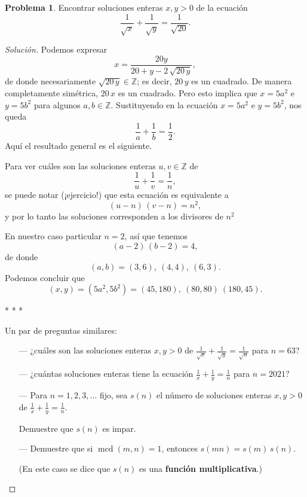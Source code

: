 \documentclass{article}
\newcommand{\ZZ}{\mathbb{Z}}
\DeclareMathOperator{\mcd}{mcd}
\theoremstyle{definition}
\newtheorem{problema}{Problema}
\newenvironment{solucion}{\begin{proof}[Solución]}{\end{proof}}
\begin{document}
\begin{problema}
  Encontrar soluciones enteras $x, y > 0$ de la ecuación
  $$\frac{1}{\sqrt{x}} + \frac{1}{\sqrt{y}} = \frac{1}{\sqrt{20}}.$$

  \ifdefined\solutions\begin{solucion}    
    Podemos expresar
    $$x = \frac{20y}{20 + y - 2\,\sqrt{20\,y}},$$
    de donde necesariamente $\sqrt{20\,y} \in \ZZ$; es decir, $20\,y$ es un
    cuadrado. De manera completamente simétrica, $20\,x$ es un cuadrado. Pero
    esto implica que $x = 5a^2$ e $y = 5b^2$ para algunos $a,b \in \ZZ$.
    Sustituyendo en la ecuación $x = 5a^2$ e $y = 5b^2$, nos queda
    $$\frac{1}{a} + \frac{1}{b} = \frac{1}{2}.$$
    Aquí el resultado general es el siguiente.

    \begin{framed}
      Para ver cuáles son las soluciones enteras $u,v \in \ZZ$ de
      $$\frac{1}{u} + \frac{1}{v} = \frac{1}{n},$$
      se puede notar (¡ejercicio!) que esta ecuación es equivalente a
      $$(u - n)\,(v - n) = n^2,$$
      y por lo tanto las soluciones corresponden a los divisores de $n^2$
    \end{framed}

    En nuestro caso particular $n = 2$, así que tenemos
    $$(a - 2)\,(b - 2) = 4,$$
    de donde
    $$(a,b) = (3,6), ~ (4,4), ~ (6,3).$$
    Podemos concluir que
    $$(x,y) = (5a^2,5b^2) = (45, 180), ~ (80,80) ~ (180,45).$$

    \begin{center}
      * * *
    \end{center}

    Un par de preguntas similares:

    \begin{itemize}
    \item[---] ¿cuáles son las soluciones enteras $x,y > 0$ de
      $\frac{1}{\sqrt{x}} + \frac{1}{\sqrt{y}} = \frac{1}{\sqrt{n}}$ para
      $n = 63$?

    \item[---] ¿cuántas soluciones enteras tiene la ecuación
      $\frac{1}{x} + \frac{1}{y} = \frac{1}{n}$ para $n = 2021$?

    \item[---] Para $n = 1,2,3,\ldots$ fijo, sea $s(n)$ el número de soluciones
      enteras $x,y > 0$ de $\frac{1}{x} + \frac{1}{y} = \frac{1}{n}$.

      Demuestre que $s(n)$ es impar.

    \item[---] Demuestre que si $\mcd (m,n) = 1$, entonces $s(mn) = s(m)\,s(n)$.

      (En este caso se dice que $s (n)$ es una \textbf{función multiplicativa}.)
    \end{itemize}
  \end{solucion}\fi
\end{problema}
\end{document}
